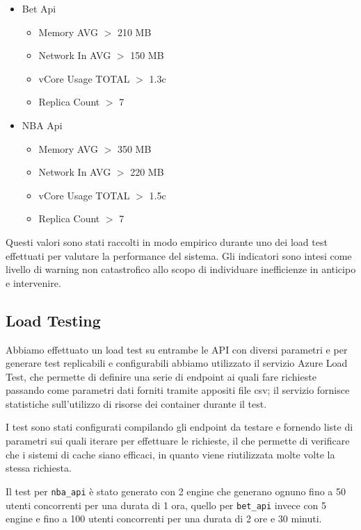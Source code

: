 \begin{itemize}
    \item Bet Api
    \begin{itemize}
        \item Memory AVG $>$ 210 MB
        \item Network In AVG $>$ 150 MB
        \item vCore Usage TOTAL $>$ 1.3c
        \item Replica Count $>$ 7
    \end{itemize}
    \item NBA Api
    \begin{itemize}
        \item Memory AVG $>$ 350 MB
        \item Network In AVG $>$ 220 MB
        \item vCore Usage TOTAL $>$ 1.5c
        \item Replica Count $>$ 7
    \end{itemize}
\end{itemize}

Questi valori sono stati raccolti in modo empirico durante uno dei load test effettuati per valutare la performance del sistema. Gli indicatori sono intesi come livello di warning non catastrofico allo scopo di individuare inefficienze in anticipo e intervenire.

\subsection{Load Testing}
Abbiamo effettuato un load test su entrambe le API con diversi parametri e per generare test replicabili e configurabili abbiamo utilizzato il servizio Azure Load Test, che permette di definire una serie di endpoint ai quali fare richieste passando come parametri dati forniti tramite appositi file csv; il servizio fornisce statistiche sull'utilizzo di risorse dei container durante il test.

I test sono stati configurati compilando gli endpoint da testare e fornendo liste di parametri sui quali iterare per effettuare le richieste, il che permette di verificare che i sistemi di cache siano efficaci, in quanto viene riutilizzata molte volte la stessa richiesta.

Il test per \texttt{nba\_api} è stato generato con 2 engine che generano ognuno fino a 50 utenti concorrenti per una durata di 1 ora, quello per \texttt{bet\_api} invece con 5 engine e fino a 100 utenti concorrenti per una durata di 2 ore e 30 minuti.

